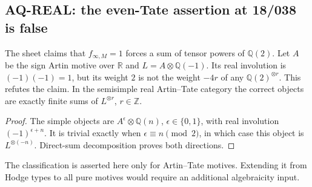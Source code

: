 \documentclass[11pt,a4paper]{article}
\theoremstyle{definition}\newtheorem{definition}[theorem]{Definition}
\theoremstyle{remark}\newtheorem{remark}[theorem]{Remark}
\begin{document}
\subsection{AQ-REAL: the even-Tate assertion at 18/038 is false}
The sheet claims that $f_{\infty,M}=1$ forces a sum of
tensor powers of $\mathbb Q(2)$.
Let $A$ be the sign Artin motive over $\mathbb R$ and
$L=A\otimes\mathbb Q(-1)$. Its real involution is
$(-1)(-1)=1$, but its weight $2$ is not the weight $-4r$
of any $\mathbb Q(2)^{\otimes r}$. This refutes the claim.
In the semisimple real Artin--Tate category the correct
objects are exactly finite sums of $L^{\otimes r}$,
$r\in\mathbb Z$.
\begin{proof}
The simple objects are $A^\epsilon\otimes\mathbb Q(n)$,
$\epsilon\in\{0,1\}$, with real involution
$(-1)^{\epsilon+n}$. It is trivial exactly when
$\epsilon\equiv n\pmod2$, in which case this object is
$L^{\otimes(-n)}$. Direct-sum decomposition proves both
directions.
\end{proof}
The classification is asserted here only for Artin--Tate
motives. Extending it from Hodge types to all pure motives
would require an additional algebraicity input.
\end{document}
